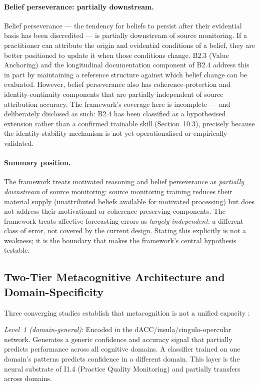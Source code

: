 \documentclass[12pt, a4paper]{article}
\begin{document}
\paragraph{Belief perseverance: partially downstream.}
Belief perseverance --- the tendency for beliefs to persist after their
evidential basis has been discredited --- is partially downstream of source
monitoring. If a practitioner can attribute the origin and evidential conditions
of a belief, they are better positioned to update it when those conditions
change. B2.3 (Value Anchoring) and the longitudinal documentation component
of B2.4 address this in part by maintaining a reference structure against which
belief change can be evaluated. However, belief perseverance also has
coherence-protection and identity-continuity components that are partially
independent of source attribution accuracy. The framework's coverage here is
incomplete --- and deliberately disclosed as such: B2.4 has been classified as
a hypothesised extension rather than a confirmed trainable skill (Section~10.3),
precisely because the identity-stability mechanism is not yet operationalised
or empirically validated.

\paragraph{Summary position.}
The framework treats motivated reasoning and belief perseverance as
\emph{partially downstream} of source monitoring: source monitoring training
reduces their material supply (unattributed beliefs available for motivated
processing) but does not address their motivational or coherence-preserving
components. The framework treats affective forecasting errors as
\emph{largely independent}: a different class of error, not covered by the
current design. Stating this explicitly is not a weakness; it is the boundary
that makes the framework's central hypothesis testable.

\subsection{Two-Tier Metacognitive Architecture and Domain-Specificity}

Three converging studies establish that metacognition is not a unified capacity
\citep{morales2018, shekhar2018, fleming2014}:

\emph{Level~1 (domain-general)}: Encoded in the dACC/insula/cingulo-opercular
network. Generates a generic confidence and accuracy signal that partially predicts
performance across all cognitive domains. A classifier trained on one domain's
patterns predicts confidence in a different domain. This layer is the neural
substrate of I1.4 (Practice Quality Monitoring) and partially transfers across
domains.
\end{document}
